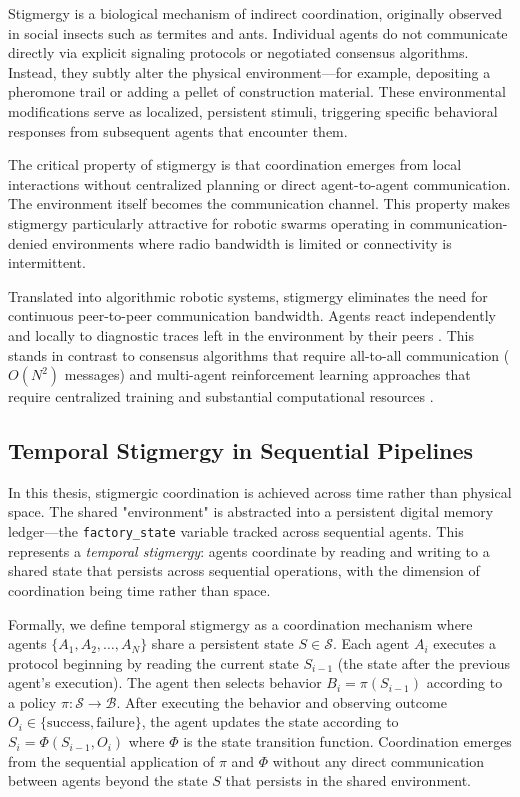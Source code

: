 \documentclass[12pt,a4paper,oneside]{report}
\begin{document}
Stigmergy is a biological mechanism of indirect coordination, originally observed in social insects such as termites and ants. Individual agents do not communicate directly via explicit signaling protocols or negotiated consensus algorithms. Instead, they subtly alter the physical environment—for example, depositing a pheromone trail or adding a pellet of construction material. These environmental modifications serve as localized, persistent stimuli, triggering specific behavioral responses from subsequent agents that encounter them.

The critical property of stigmergy is that coordination emerges from local interactions without centralized planning or direct agent-to-agent communication. The environment itself becomes the communication channel. This property makes stigmergy particularly attractive for robotic swarms operating in communication-denied environments where radio bandwidth is limited or connectivity is intermittent.

Translated into algorithmic robotic systems, stigmergy eliminates the need for continuous peer-to-peer communication bandwidth. Agents react independently and locally to diagnostic traces left in the environment by their peers \cite{bongard2006resilient}. This stands in contrast to consensus algorithms that require all-to-all communication ($O(N^2)$ messages) and multi-agent reinforcement learning approaches that require centralized training and substantial computational resources \cite{domberg2026selfadapting, daneshmand2026slowrl}.

\subsection{Temporal Stigmergy in Sequential Pipelines}
\label{subsec:temporal_stigmergy_in_sequential_pipelines}

In this thesis, stigmergic coordination is achieved across time rather than physical space. The shared "environment" is abstracted into a persistent digital memory ledger—the \texttt{factory\_state} variable tracked across sequential agents. This represents a \textit{temporal stigmergy}: agents coordinate by reading and writing to a shared state that persists across sequential operations, with the dimension of coordination being time rather than space.

Formally, we define temporal stigmergy as a coordination mechanism where agents $\{A_1, A_2, \ldots, A_N\}$ share a persistent state $S \in \mathcal{S}$. Each agent $A_i$ executes a protocol beginning by reading the current state $S_{i-1}$ (the state after the previous agent's execution). The agent then selects behavior $B_i = \pi(S_{i-1})$ according to a policy $\pi: \mathcal{S} \rightarrow \mathcal{B}$. After executing the behavior and observing outcome $O_i \in \{\text{success}, \text{failure}\}$, the agent updates the state according to $S_i = \Phi(S_{i-1}, O_i)$ where $\Phi$ is the state transition function. Coordination emerges from the sequential application of $\pi$ and $\Phi$ without any direct communication between agents beyond the state $S$ that persists in the shared environment.
\end{document}

